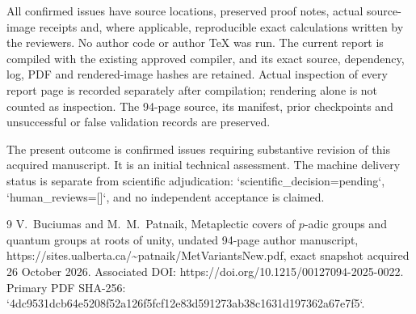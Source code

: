 \documentclass[10pt]{article}
\begin{document}
All confirmed issues have source locations, preserved proof notes, actual source-image receipts and, where applicable, reproducible exact calculations written by the reviewers. No author code or author TeX was run. The current report is compiled with the existing approved compiler, and its exact source, dependency, log, PDF and rendered-image hashes are retained. Actual inspection of every report page is recorded separately after compilation; rendering alone is not counted as inspection. The 94-page source, its manifest, prior checkpoints and unsuccessful or false validation records are preserved.\par
The present outcome is confirmed issues requiring substantive revision of this acquired manuscript. It is an initial technical assessment. The machine delivery status is separate from scientific adjudication: `scientific\_decision=pending`, `human\_reviews=[]`, and no independent acceptance is claimed.\par
9 V. Buciumas and M. M. Patnaik, Metaplectic covers of \(p\)-adic groups and quantum groups at roots of unity, undated 94-page author manuscript, https://sites.ualberta.ca/\textasciitilde{}patnaik/MetVariantsNew.pdf, exact snapshot acquired 26 October 2026. Associated DOI: https://doi.org/10.1215/00127094-2025-0022. Primary PDF SHA-256: `4dc9531dcb64e5208f52a126f5fcf12e83d591273ab38c1631d197362a67e7f5`.\par
\end{document}
